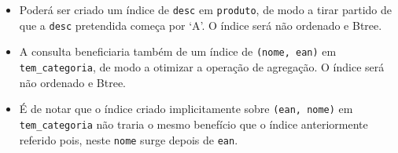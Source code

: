 \documentclass{article}
\begin{document}
\begin{itemize}
	\item Poderá ser criado um índice de \texttt{desc} em \texttt{produto}, de modo a tirar partido de que a \texttt{desc} pretendida começa por `A'. O índice será não ordenado e Btree.
	\item A consulta beneficiaria também de um índice de \texttt{(nome, ean)} em \texttt{tem\_categoria}, de modo a otimizar a operação de agregação. O índice será não ordenado e Btree.
	\item É de notar que o índice criado implicitamente sobre \texttt{(ean, nome)} em \texttt{tem\_categoria} não traria o mesmo benefício que o índice anteriormente referido pois, neste \texttt{nome} surge depois de \texttt{ean}.
\end{itemize}
\end{document}
